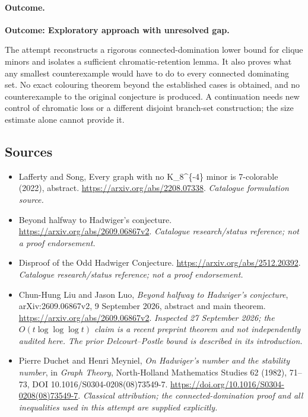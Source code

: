 \documentclass[11pt,a4paper]{article}
\numberwithin{equation}{section}
\begin{document}
\paragraph{Outcome.}
\textbf{Outcome: Exploratory approach with unresolved gap.}

The attempt reconstructs a rigorous connected-domination lower bound for
clique minors and isolates a sufficient chromatic-retention lemma. It also
proves what any smallest counterexample would have to do to every connected
dominating set. No exact colouring theorem beyond the established cases
is obtained, and no counterexample to the original conjecture is produced.
A continuation needs new control of chromatic loss or a different disjoint
branch-set construction; the size estimate alone cannot provide it.
\subsection{Sources}
\begin{itemize}\raggedright
\item[\textnormal{[S1]}]\hypertarget{source:80:1}{} Lafferty and Song, Every graph with no K\_8\textasciicircum{}\{-4\} minor is 7-colorable (2022), abstract.
\url{https://arxiv.org/abs/2208.07338}.
{\small\textit{Catalogue formulation source.}}
\item[\textnormal{[S2]}]\hypertarget{source:80:2}{} Beyond halfway to Hadwiger's conjecture.
\url{https://arxiv.org/abs/2609.06867v2}.
{\small\textit{Catalogue research/status reference; not a proof endorsement.}}
\item[\textnormal{[S3]}]\hypertarget{source:80:3}{} Disproof of the Odd Hadwiger Conjecture.
\url{https://arxiv.org/abs/2512.20392}.
{\small\textit{Catalogue research/status reference; not a proof endorsement.}}
\item[\textnormal{[E1]}]\hypertarget{extra:80:1}{} Chun-Hung Liu and
Jason Luo, \emph{Beyond halfway to Hadwiger's conjecture},
arXiv:2609.06867v2, 9 September 2026, abstract and main theorem.
\url{https://arxiv.org/abs/2609.06867v2}.
{\small\textit{Inspected 27 September 2026; the $O(t\log\log\log t)$
claim is a recent preprint theorem and not independently audited here.
The prior Delcourt--Postle bound is described in its introduction.}}
\item[\textnormal{[E2]}]\hypertarget{extra:80:2}{} Pierre Duchet and
Henri Meyniel, \emph{On Hadwiger's number and the stability number},
in \emph{Graph Theory}, North-Holland Mathematics Studies 62 (1982),
71--73, DOI 10.1016/S0304-0208(08)73549-7.
\url{https://doi.org/10.1016/S0304-0208(08)73549-7}.
{\small\textit{Classical attribution; the connected-domination proof and
all inequalities used in this attempt are supplied explicitly.}}
\end{itemize}
\end{document}
